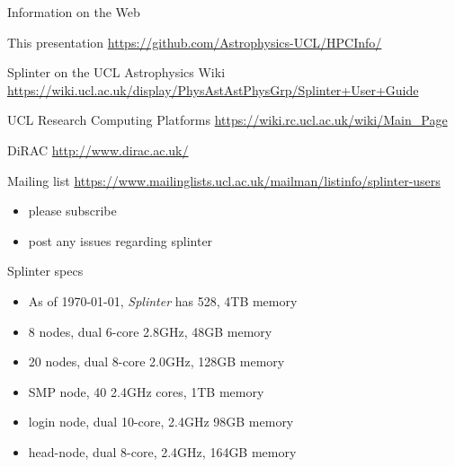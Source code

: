 \documentclass{beamer}
\begin{document}
\begin{frame}{Information on the Web}
  \begin{block}{This presentation}
    \url{https://github.com/Astrophysics-UCL/HPCInfo/}
  \end{block}

    \begin{block}{Splinter on the UCL Astrophysics Wiki}
    \url{https://wiki.ucl.ac.uk/display/PhysAstAstPhysGrp/Splinter+User+Guide}
  \end{block}

  \begin{block}{UCL Research Computing Platforms}
    \url{https://wiki.rc.ucl.ac.uk/wiki/Main_Page}
  \end{block}

  \begin{block}{DiRAC}
    \url{http://www.dirac.ac.uk/}
  \end{block}

\end{frame}

\begin{frame}{Mailing list}
	\url{https://www.mailinglists.ucl.ac.uk/mailman/listinfo/splinter-users}
	\bigskip
	\begin{itemize}
		\item please subscribe
		\item post any issues regarding splinter
	\end{itemize}
\end{frame}

\begin{frame}{Splinter specs}
	\begin{itemize}
		\item As of \today, \emph{Splinter} has 528, 4TB memory
		\item 8 nodes, dual 6-core 2.8GHz, 48GB memory 
		\item 20 nodes, dual 8-core 2.0GHz, 128GB memory
		\item SMP node, 40 2.4GHz cores, 1TB memory
		\item login node, dual 10-core, 2.4GHz 98GB memory
		\item head-node, dual 8-core, 2.4GHz, 164GB memory
	\end{itemize}
\end{frame}
\end{document}
